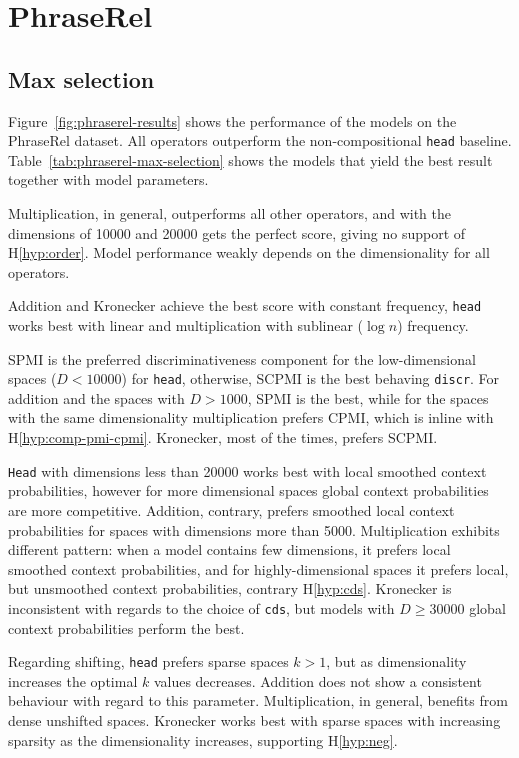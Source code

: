 \section{PhraseRel}
\label{sec:phraserel-experiment}

\subsection{Max selection}
\label{sec:max-selection-phraserel}



Figure~\ref{fig:phraserel-results} shows the performance of the models on the PhraseRel dataset. All operators outperform the non-compositional \texttt{head} baseline. Table~\ref{tab:phraserel-max-selection} shows the models that yield the best result together with model parameters.

Multiplication, in general, outperforms all other operators, and with the dimensions of 10000 and 20000 gets the perfect score, giving no support of H\ref{hyp:order}. Model performance weakly depends on the dimensionality for all operators.

Addition and Kronecker achieve the best score with constant frequency, \texttt{head} works best with linear and multiplication with sublinear ($\log n$) frequency.

SPMI is the preferred discriminativeness component for the low-dimensional spaces ($D < 10000$) for \texttt{head}, otherwise, SCPMI is the best behaving \texttt{discr}. For addition and the spaces with $D > 1000$, SPMI is the best, while for the spaces with the same dimensionality multiplication prefers CPMI, which is inline with H\ref{hyp:comp-pmi-cpmi}. Kronecker, most of the times, prefers SCPMI.

\texttt{Head} with dimensions less than 20000 works best with local smoothed context probabilities, however for more dimensional spaces global context probabilities are more competitive. Addition, contrary, prefers smoothed local context probabilities for spaces with dimensions more than 5000. Multiplication exhibits different pattern: when a model contains few dimensions, it prefers local smoothed context probabilities, and for highly-dimensional spaces it prefers local, but unsmoothed context probabilities, contrary H\ref{hyp:cds}. Kronecker is inconsistent with regards to the choice of \texttt{cds}, but models with $D \geq 30000$ global context probabilities perform the best.

Regarding shifting, \texttt{head} prefers sparse spaces $k > 1$, but as dimensionality increases the optimal $k$ values decreases. Addition does not show a consistent behaviour with regard to this parameter. Multiplication, in general, benefits from dense unshifted spaces. Kronecker works best with sparse spaces with increasing sparsity as the dimensionality increases, supporting H\ref{hyp:neg}.

